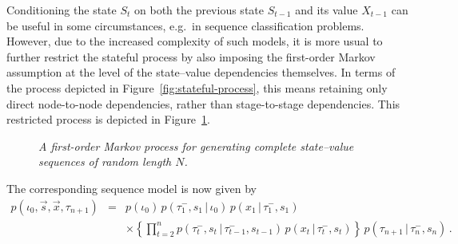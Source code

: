 \documentclass[a4paper]{article}
\newcommand{\tm}{\tau^{-}}
\newcommand{\vs}{\vec{s}}
\newcommand{\vx}{\vec{x}}
\begin{document}
Conditioning the state $S_t$ on both the previous state $S_{t-1}$ and its value $X_{t-1}$
can be useful in some circumstances, e.g.\ in sequence classification problems.
However, due to the increased complexity of such models, it is more usual to further restrict the stateful process
by also imposing the first-order Markov assumption at the level
of the state--value dependencies themselves. In terms of the process depicted in Figure~\ref{fig:stateful-process},
this means retaining only direct node-to-node dependencies, rather than stage-to-stage dependencies.
This restricted process is depicted in Figure~\ref{fig:stateful-1-process}.
\begin{figure}[hbt]
\centering
{}
\caption{\em A first-order Markov process for generating complete state--value  sequences of random length $N$.}
\label{fig:stateful-1-process}
\end{figure}
The corresponding sequence model is now given by
\begin{eqnarray}
p(\iota_0,\vs,\vx,\tau_{n+1}) & = &
p(\iota_0)\,p(\tm_1,s_1\,|\,\iota_0)\,p(x_1\,|\,\tm_1,s_1)
\nonumber\\{}&&\times
\left\{\prod_{t=2}^{n}p(\tm_t,s_t\,|\,\tm_{t-1},s_{t-1})\,p(x_t\,|\,\tm_t,s_t)\right\}
\,p(\tau_{n+1}\,|\,\tm_n,s_n)\,.
\label{eq:stateful-1-model}
\end{eqnarray}
\end{document}
